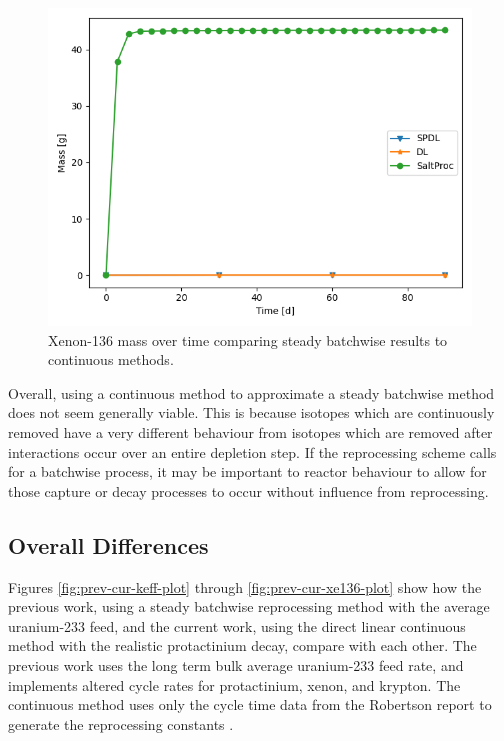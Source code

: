 \begin{figure}[H]
  \centering
  \includegraphics[scale=0.7]{images/soln-1-xe136.png}
  \caption{Xenon-136 mass over time comparing steady batchwise results to continuous methods.}
   \label{fig:steady-compare-xe136}
\end{figure}

Overall, using a continuous method to approximate a steady batchwise method does not seem generally viable. This is because isotopes which are continuously removed have a very different behaviour from isotopes which are removed after interactions occur over an entire depletion step. If the reprocessing scheme calls for a batchwise process, it may be important to reactor behaviour to allow for those capture or decay processes to occur without influence from reprocessing.

\subsection{Overall Differences}

Figures \ref{fig:prev-cur-keff-plot} through  \ref{fig:prev-cur-xe136-plot} show how the previous work, using a steady batchwise reprocessing method with the average uranium-233 feed, and the current work, using the direct linear continuous method with the realistic protactinium decay, compare with each other. The previous work uses the long term bulk average uranium-233 feed rate, and implements altered cycle rates for protactinium, xenon, and krypton. The continuous method uses only the cycle time data from the Robertson report to generate the reprocessing constants \cite{robertson_conceptual_1971}.

